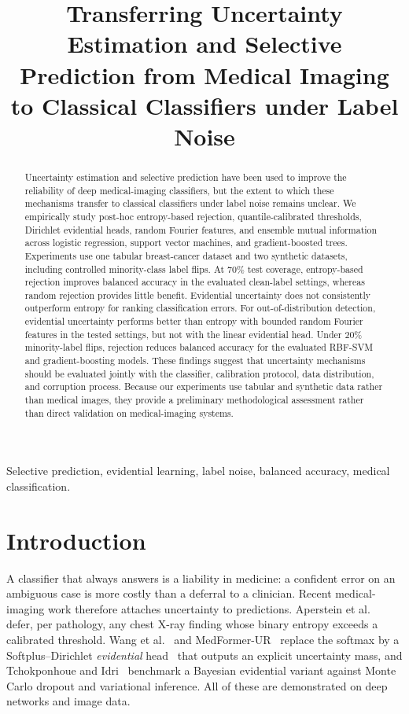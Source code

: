 \documentclass[conference]{IEEEtran}
\title{Transferring Uncertainty Estimation and Selective Prediction from Medical Imaging to Classical Classifiers under Label Noise}
\author{%
\IEEEauthorblockN{Belekotan II Jeff Nichoss, Bala Andegue Francois Lionnel,\\
Sountsa Djiele Pio Vianney, Nankeng Tsamo Pierre Marcelle, and Nkamla Chedjou Johan}
\IEEEauthorblockA{Department of Computer Engineering, National Advanced School of Engineering of Yaound\'e (ENSPY),\\
University of Yaound\'e I, Cameroon}}
\begin{document}
\maketitle

\begin{abstract}
Uncertainty estimation and selective prediction have been used to improve the reliability of deep medical-imaging classifiers, but the extent to which these mechanisms transfer to classical classifiers under label noise remains unclear. We empirically study post-hoc entropy-based rejection, quantile-calibrated thresholds, Dirichlet evidential heads, random Fourier features, and ensemble mutual information across logistic regression, support vector machines, and gradient-boosted trees. Experiments use one tabular breast-cancer dataset and two synthetic datasets, including controlled minority-class label flips. At 70\% test coverage, entropy-based rejection improves balanced accuracy in the evaluated clean-label settings, whereas random rejection provides little benefit. Evidential uncertainty does not consistently outperform entropy for ranking classification errors. For out-of-distribution detection, evidential uncertainty performs better than entropy with bounded random Fourier features in the tested settings, but not with the linear evidential head. Under 20\% minority-label flips, rejection reduces balanced accuracy for the evaluated RBF-SVM and gradient-boosting models. These findings suggest that uncertainty mechanisms should be evaluated jointly with the classifier, calibration protocol, data distribution, and corruption process. Because our experiments use tabular and synthetic data rather than medical images, they provide a preliminary methodological assessment rather than direct validation on medical-imaging systems.
\end{abstract}
\begin{IEEEkeywords}
Selective prediction, evidential learning, label noise, balanced accuracy, medical classification.
\end{IEEEkeywords}

\section{Introduction}
A classifier that always answers is a liability in medicine: a confident error on an ambiguous case is more costly than a deferral to a clinician. Recent medical-imaging work therefore attaches uncertainty to predictions. Aperstein et al.~\cite{aperstein2026selective} defer, per pathology, any chest X-ray finding whose binary entropy exceeds a calibrated threshold. Wang et al.~\cite{wang2023uios} and MedFormer-UR~\cite{sibhai2026medformerur} replace the softmax by a Softplus--Dirichlet \emph{evidential} head~\cite{sensoy2018edl} that outputs an explicit uncertainty mass, and Tchokponhoue and Idri~\cite{tchokponhoue2026bedl} benchmark a Bayesian evidential variant against Monte Carlo dropout and variational inference. All of these are demonstrated on deep networks and image data.
\end{document}
